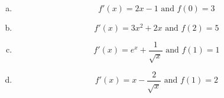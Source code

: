 \documentclass[12pt]{article}
\begin{document}
\bigskip

\bigskip


 \n
{}

\begin{enumerate}[a) ]
\item 
$$
f'(x)=2x-1 \text{ and } f(0)=3
$$

\item 
$$
f'(x)=3x^2+2x \text{ and } f(2)=5
$$

\item 
$$
f'(x)=e^x+\frac{1}{\sqrt{ x }} \text{ and } f(1)=1
$$

\item 
$$
f'(x)=x-\frac{2}{\sqrt{ x }} \text{ and } f(1)=2
$$
\end{enumerate} 
 
 
\end{document}

